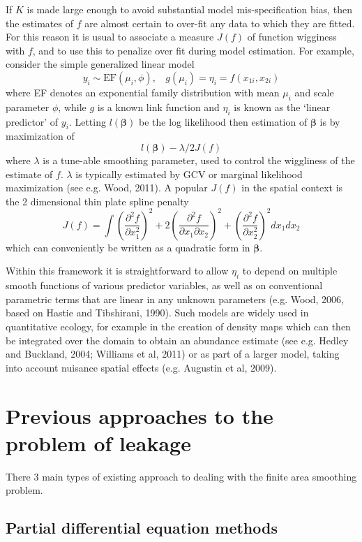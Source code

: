 \documentclass[useAMS, referee]{biom}
\newcommand{\pdif}[2]{\frac{\partial #1}{\partial #2}}
\newcommand{\pddif}[3]{\frac{\partial^2 #1}{\partial #2 \partial #3}}
\begin{document}
If $K$ is made large enough to avoid substantial model mis-specification bias, then the estimates of $f$ are almost certain to over-fit any data to which they are fitted. For this reason it is usual to associate a measure $J(f)$ of function wigginess with $f$, and to use this to penalize over fit during model estimation. 
For example, consider the simple generalized linear model  
$$
y_i \sim \text{EF}(\mu_i, \phi),~~~~ g(\mu_i) = \eta_i =f(x_{1i},x_{2i})
$$
where EF denotes an exponential family distribution with mean $\mu_i$ and scale parameter $\phi$, while $g$ is a known link function and $\eta_i$ is known as the `linear predictor' of $y_i$. Letting $l({\bm \beta})$ be the log likelihood then estimation of $\bm \beta$ is by maximization of 
$$
l({\bm \beta}) - \lambda/2 J(f)
$$ 
where $\lambda$ is a tune-able smoothing parameter, used to control the wiggliness of the estimate of $f$. $\lambda $ is typically estimated by GCV or marginal likelihood maximization (see e.g. Wood, 2011). A popular $J(f)$ in the spatial context is the 2 dimensional thin plate spline penalty
$$
J(f) = \int \left (\pdif{^2 f}{x_1^2}\right )^2 + 2\left ( \pddif{f}{x_1}{x_2}\right )^2 + \left (\pdif{^2 f}{x_2^2}\right )^2 dx_1 dx_2
$$
which can conveniently be written as a quadratic form in $\bm \beta$. 

Within this framework it is straightforward to allow $\eta_i$ to depend on multiple smooth functions of various predictor variables, as well as on conventional parametric terms that are linear in any unknown parameters (e.g. Wood, 2006, based on Hastie and Tibshirani, 1990). Such models are widely used in quantitative ecology, for example in the creation of density maps which can then be integrated over the domain to obtain an abundance estimate (see e.g.  Hedley and Buckland, 2004; Williams et al, 2011) or as part of a larger model, taking into account nuisance spatial effects (e.g. Augustin et al, 2009). 

\section{Previous approaches to the problem of leakage}
\label{previous-approaches}

There 3 main types of existing approach to dealing with the finite area smoothing problem.

\subsection*{Partial differential equation methods}
\end{document}
